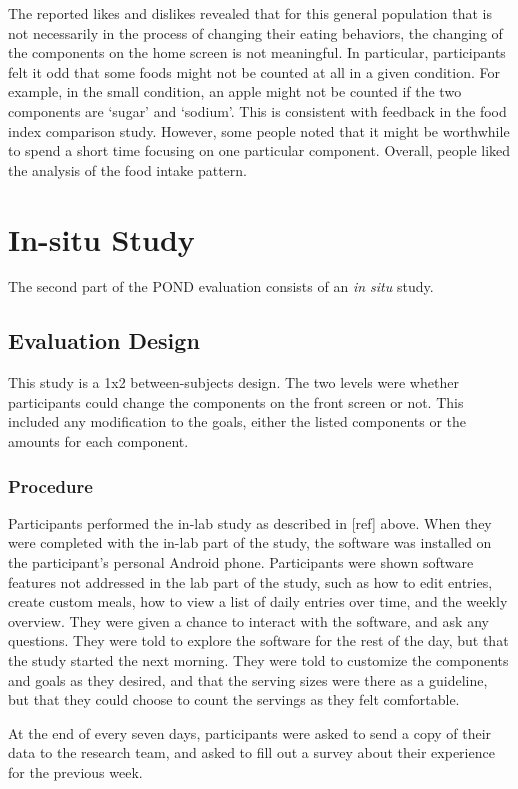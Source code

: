 The reported likes and dislikes revealed that for this general population that is not necessarily in the process of changing their eating behaviors, the changing of the components on the home screen is not meaningful. In particular, participants felt it odd that some foods might not be counted at all in a given condition. For example, in the small condition, an apple might not be counted if the two components are `sugar' and `sodium'. This is consistent with feedback in the food index comparison study. However, some people noted that it might be worthwhile to spend a short time focusing on one particular component. Overall, people liked the analysis of the food intake pattern. 

\section{In-situ Study}

The second part of the POND evaluation consists of an \textit{in situ} study. 

\subsection{Evaluation Design}
This study is a 1x2 between-subjects design. The two levels were whether participants could change the components on the front screen or not. This included any modification to the goals, either the listed components or the amounts for each component. 

\subsubsection{Procedure}
Participants performed the in-lab study as described in [ref] above. When they were completed with the in-lab part of the study, the software was installed on the participant's personal Android phone. Participants were shown software features not addressed in the lab part of the study, such as how to edit entries, create custom meals, how to view a list of daily entries over time, and the weekly overview. They were given a chance to interact with the software, and ask any questions. They were told to explore the software for the rest of the day, but that the study started the next morning. They were told to customize the components and goals as they desired, and that the serving sizes were there as a guideline, but that they could choose to count the servings as they felt comfortable. 

At the end of every seven days, participants were asked to send a copy of their data to the research team, and asked to fill out a survey about their experience for the previous week. 

